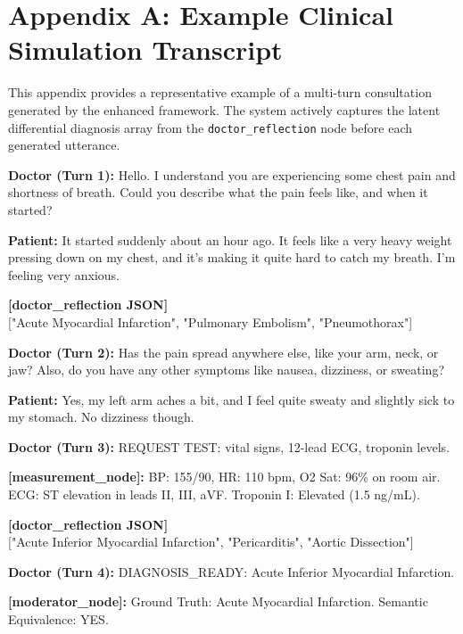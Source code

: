 \chapter*{Appendix A: Example Clinical Simulation Transcript}

This appendix provides a representative example of a multi-turn consultation generated by the enhanced framework. The system actively captures the latent differential diagnosis array from the \texttt{doctor\_reflection} node before each generated utterance.

\vspace{0.5cm}

\begin{ttfamily}
\noindent \textbf{Doctor (Turn 1):} Hello. I understand you are experiencing some chest pain and shortness of breath. Could you describe what the pain feels like, and when it started?

\vspace{0.2cm}
\noindent \textbf{Patient:} It started suddenly about an hour ago. It feels like a very heavy weight pressing down on my chest, and it's making it quite hard to catch my breath. I'm feeling very anxious.

\vspace{0.3cm}
\noindent \textbf{[doctor\_reflection JSON]}\\
{[}"Acute Myocardial Infarction", "Pulmonary Embolism", "Pneumothorax"{]}

\vspace{0.3cm}
\noindent \textbf{Doctor (Turn 2):} Has the pain spread anywhere else, like your arm, neck, or jaw? Also, do you have any other symptoms like nausea, dizziness, or sweating?

\vspace{0.2cm}
\noindent \textbf{Patient:} Yes, my left arm aches a bit, and I feel quite sweaty and slightly sick to my stomach. No dizziness though.

\vspace{0.3cm}
\noindent \textbf{Doctor (Turn 3):} REQUEST TEST: vital signs, 12-lead ECG, troponin levels.

\vspace{0.2cm}
\noindent \textbf{[measurement\_node]:} BP: 155/90, HR: 110 bpm, O2 Sat: 96\% on room air. 
ECG: ST elevation in leads II, III, aVF. 
Troponin I: Elevated (1.5 ng/mL).

\vspace{0.3cm}
\noindent \textbf{[doctor\_reflection JSON]}\\
{[}"Acute Inferior Myocardial Infarction", "Pericarditis", "Aortic Dissection"{]}

\vspace{0.3cm}
\noindent \textbf{Doctor (Turn 4):} DIAGNOSIS\_READY: Acute Inferior Myocardial Infarction.

\vspace{0.2cm}
\noindent \textbf{[moderator\_node]:} Ground Truth: Acute Myocardial Infarction. Semantic Equivalence: YES.
\end{ttfamily}
